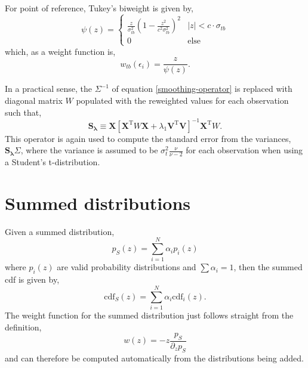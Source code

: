 \documentclass[10pt,journal]{IEEEtran}
\begin{document}
For point of reference, Tukey's biweight is given by,
\begin{equation}
\psi(z) = 
\begin{cases}
\frac{z}{\sigma_{tb}^2} \left(1-\frac{z^2}{c^2 \sigma_{tb}^2} \right)^2 & |z| < c \cdot \sigma_{tb} \\
0 & \textrm{else}
\end{cases}
\end{equation}
which, as a weight function is,
\begin{equation}
    w_{tb}(\epsilon_i) = \frac{z}{\psi(z)}.
\end{equation}

In a practical sense, the $\Sigma^{-1}$ of equation \ref{smoothing-operator} is replaced with diagonal matrix $W$ populated with the reweighted values for each observation such that,
\begin{equation}
\label{general-smoothing-operator}
\mathbf{S_\lambda} \equiv \mathbf{X} \left[ \mathbf{X}^{\textrm{T}} W \mathbf{X} + \lambda_1 \mathbf{V}^{\textrm{T}} \mathbf{V} \right]^{-1} \mathbf{X}^{\textrm{T}} W.
\end{equation}
This operator is again used to compute the standard error from the variances,  $\mathbf{S_\lambda} \Sigma$, where the variance is assumed to be $\sigma_t^2 \frac{\nu}{\nu-2}$ for each observation when using a Student's t-distribution.

\section{Summed distributions}
\label{sec:summed_distributions}

Given a summed distribution,
\begin{equation}
    p_S(z) = \sum_{i=1}^N \alpha_i p_i(z)
\end{equation}
where $p_i(z)$ are valid probability distributions and $\sum \alpha_i = 1$, then the summed cdf is given by,
\begin{equation}
    \textrm{cdf}_S(z) = \sum_{i=1}^N \alpha_i \textrm{cdf}_i(z).
\end{equation}
The weight function for the summed distribution just follows straight from the definition,
\begin{equation}
    w(z) = - z\frac{p_S}{\partial_z p_S}
\end{equation}
and can therefore be computed automatically from the distributions being added.

\end{document}

